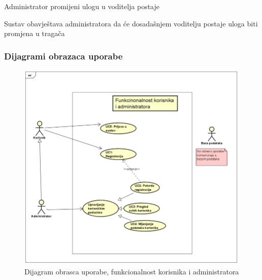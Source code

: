 \begin{packed_item}
\begin{packed_item}
							\item[4.b] Administrator promijeni ulogu u voditelja postaje
							\item[] \begin{packed_enum}
								
								\item Sustav obavještava administratora da će dosadašnjem voditelju postaje uloga biti promjena u tragača
								
							\end{packed_enum}
							
						\end{packed_item}
					\end{packed_item}
					
				\eject
					
					
				\subsubsection{Dijagrami obrazaca uporabe}
					\begin{figure}[H]
						\includegraphics[scale=0.8]{dijagrami/Korisnik-admin-dijagram.PNG} 
						\centering
						\caption{Dijagram obrasca uporabe, funkcionalnost korisnika i administratora}
						\label{fig:promjene}
					\end{figure}	
					
